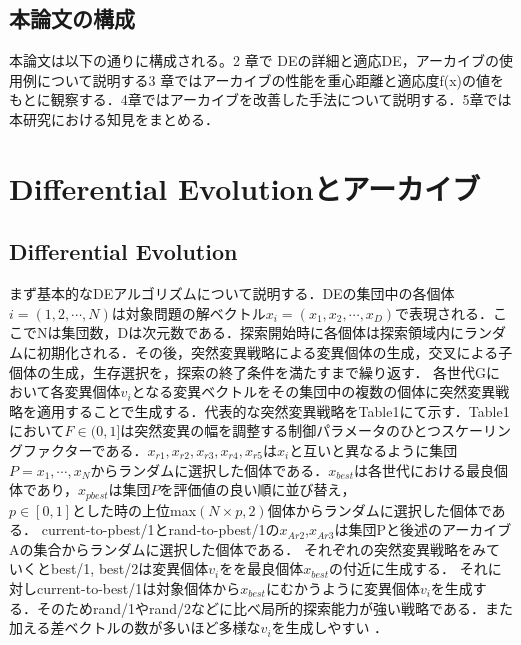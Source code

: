 \documentclass[a4paper,11pt,oneside,openany]{jsbook}
\begin{document}
\section{本論文の構成}
本論文は以下の通りに構成される。2 章で DEの詳細と適応DE，アーカイブの使用例について説明する3 章ではアーカイブの性能を重心距離と適応度f(x)の値をもとに観察する．4章ではアーカイブを改善した手法について説明する．5章では本研究における知見をまとめる．

\chapter{Differential Evolutionとアーカイブ}
\section{Differential Evolution}
まず基本的なDEアルゴリズムについて説明する．DEの集団中の各個体${i} = (1, 2, \cdots, N)$は対象問題の解ベクトル${x_i} = (x_1, x_2, \cdots, x_D)$で表現される．ここでNは集団数，Dは次元数である．探索開始時に各個体は探索領域内にランダムに初期化される．その後，突然変異戦略による変異個体の生成，交叉による子個体の生成，生存選択を，探索の終了条件を満たすまで繰り返す．
各世代Gにおいて各変異個体${v_i}$となる変異ベクトルをその集団中の複数の個体に突然変異戦略を適用することで生成する．代表的な突然変異戦略をTable1にて示す．Table1において${F\in(0,1]}$は突然変異の幅を調整する制御パラメータのひとつスケーリングファクターである．$x_{r1},x_{r2},x_{r3},x_{r4},x_{r5}$は${x_i}$と互いと異なるように集団$P = {x_1, \cdots, x_N}$からランダムに選択した個体である．$x_{best}$は各世代における最良個体であり，$x_{pbest}$は集団$P$を評価値の良い順に並び替え，${p\in[0,1]}とした時の上位$max$(N \times p, 2)$個体からランダムに選択した個体である．
current-to-pbest/1とrand-to-pbest/1の${x_{Ar2}}$,${x_{Ar3}}$は集団Pと後述のアーカイブAの集合からランダムに選択した個体である．
それぞれの突然変異戦略をみていくとbest/1, best/2は変異個体{$v_i$}をを最良個体$x_{best}$の付近に生成する．
それに対しcurrent-to-best/1は対象個体から$x_{best}$にむかうように変異個体{$v_i$}を生成する．そのためrand/1やrand/2などに比べ局所的探索能力が強い戦略である．また加える差ベクトルの数が多いほど多様な{$v_i$}を生成しやすい   ．
\end{document}
